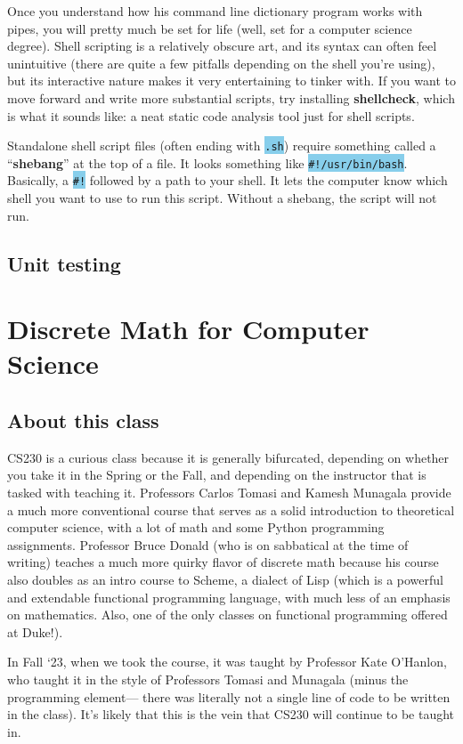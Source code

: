 \documentclass[fontsize=12pt,twoside=on,openright,parskip=half]{scrbook}
\newcommand{\code}[1]{\colorbox{skyblue}{\texttt{#1}}}
\begin{document}
Once you understand how his command line dictionary program works with pipes,
you will pretty much be set for life (well, set for a computer science degree).
Shell scripting is a relatively obscure art, and its syntax can often feel
unintuitive (there are quite a few pitfalls depending on the shell you’re
using), but its interactive nature makes it very entertaining to tinker with.
If you want to move forward and write more substantial scripts, try installing
\textbf{shellcheck}, which is what it sounds like: a neat static code analysis
tool just for shell scripts.

Standalone shell script files (often ending with \code{.sh}) require something
called a ``\textbf{shebang}'' at the top of a file. It looks something like
\code{\#!/usr/bin/bash}. Basically, a \code{\#!} followed by a path to your
shell. It lets the computer know which shell you want to use to run this
script. Without a shebang, the script will not run.

\section*{Unit testing}

\blindtext

\chapter{Discrete Math for Computer Science}

\section*{About this class}

CS230 is a curious class because it is generally bifurcated, depending on
whether you take it in the Spring or the Fall, and depending on the instructor
that is tasked with teaching it. Professors Carlos Tomasi and Kamesh Munagala
provide a much more conventional course that serves as a solid introduction to
theoretical computer science, with a lot of math and some Python programming
assignments. Professor Bruce Donald (who is on sabbatical at the time of
writing) teaches a much more quirky flavor of discrete math because his course
also doubles as an intro course to Scheme, a dialect of Lisp (which is a
powerful and extendable functional programming language, with much less of an
emphasis on mathematics. Also, one of the only classes on functional
programming offered at Duke!). 

In Fall ‘23, when we took the course, it was taught by Professor Kate O’Hanlon,
who taught it in the style of Professors Tomasi and Munagala (minus the
programming element— there was literally not a single line of code to be
written in the class). It’s likely that this is the vein that CS230 will
continue to be taught in.
\end{document}
